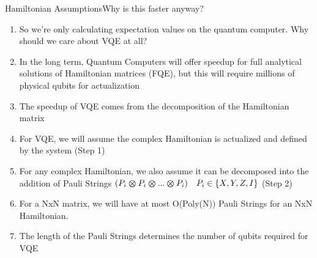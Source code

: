 \begin{frame}{Hamiltonian Assumptions}{Why is this faster anyway?}
\vspace{-2mm}
\begin{enumerate}
    \item So we're only calculating expectation values on the quantum computer. Why should we care about VQE at all?
    \item In the long term, Quantum Computers will offer speedup for full analytical solutions of Hamiltonian matrices (FQE), but this will require millions of physical qubits for actualization 
    \item The speedup of VQE comes from the decomposition of the Hamiltonian matrix
    \item For VQE, we will assume the complex Hamiltonian is actualized and defined by the system (Step 1)
    \item For any complex Hamiltonian, we also assume it can be decomposed into the addition of Pauli Strings $(P_i \bm{\otimes} P_i \bm{\otimes} ... \bm{\otimes} P_i) \quad P_i \in \{X,Y,Z,I\}$ (Step 2)
    \item For a NxN matrix, we will have at most O(Poly(N)) Pauli Strings for an NxN Hamiltonian.
    \item The length of the Pauli Strings determines the number of qubits required for VQE
    
\end{enumerate}
\end{frame}


